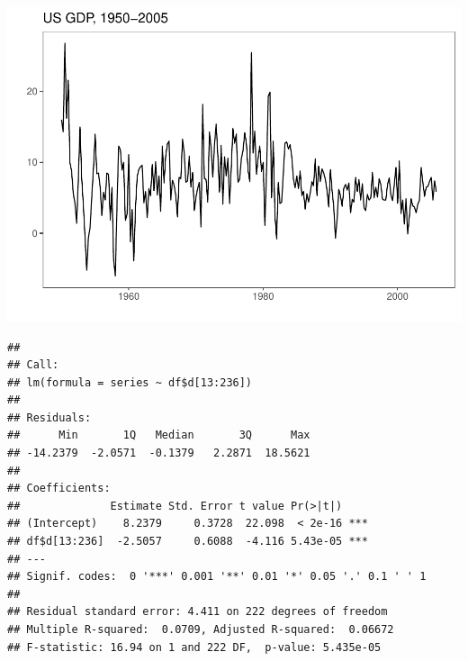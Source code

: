 \documentclass[
]{article}
\newenvironment{Shaded}{\begin{snugshade}}{\end{snugshade}}
\newcommand{\CommentTok}[1]{\textcolor[rgb]{0.56,0.35,0.01}{\textit{#1}}}
\newcommand{\DataTypeTok}[1]{\textcolor[rgb]{0.13,0.29,0.53}{#1}}
\newcommand{\DecValTok}[1]{\textcolor[rgb]{0.00,0.00,0.81}{#1}}
\newcommand{\KeywordTok}[1]{\textcolor[rgb]{0.13,0.29,0.53}{\textbf{#1}}}
\newcommand{\NormalTok}[1]{#1}
\newcommand{\OperatorTok}[1]{\textcolor[rgb]{0.81,0.36,0.00}{\textbf{#1}}}
\newcommand{\StringTok}[1]{\textcolor[rgb]{0.31,0.60,0.02}{#1}}
\begin{document}
\begin{center}\includegraphics{Econo2_P7_files/figure-latex/all-1} \end{center}

\begin{Shaded}
\end{Shaded}

\begin{verbatim}
## 
## Call:
## lm(formula = series ~ df$d[13:236])
## 
## Residuals:
##      Min       1Q   Median       3Q      Max 
## -14.2379  -2.0571  -0.1379   2.2871  18.5621 
## 
## Coefficients:
##              Estimate Std. Error t value Pr(>|t|)    
## (Intercept)    8.2379     0.3728  22.098  < 2e-16 ***
## df$d[13:236]  -2.5057     0.6088  -4.116 5.43e-05 ***
## ---
## Signif. codes:  0 '***' 0.001 '**' 0.01 '*' 0.05 '.' 0.1 ' ' 1
## 
## Residual standard error: 4.411 on 222 degrees of freedom
## Multiple R-squared:  0.0709, Adjusted R-squared:  0.06672 
## F-statistic: 16.94 on 1 and 222 DF,  p-value: 5.435e-05
\end{verbatim}
\end{document}
